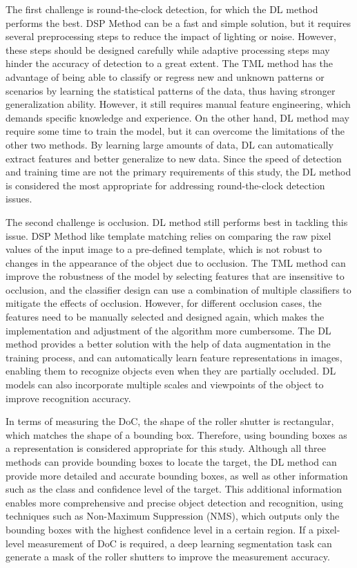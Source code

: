 The first challenge is round-the-clock detection, for which the DL method performs the best. DSP Method can be a fast and simple solution, but it requires several preprocessing steps to reduce the impact of lighting or noise. However, these steps should be designed carefully while adaptive processing steps may hinder the accuracy of detection to a great extent. The TML method has the advantage of being able to classify or regress new and unknown patterns or scenarios by learning the statistical patterns of the data, thus having stronger generalization ability. However, it still requires manual feature engineering, which demands specific knowledge and experience. On the other hand, DL method may require some time to train the model, but it can overcome the limitations of the other two methods. By learning large amounts of data, DL can automatically extract features and better generalize to new data. Since the speed of detection and training time are not the primary requirements of this study, the DL method is considered the most appropriate for addressing round-the-clock detection issues.

The second challenge is occlusion. DL method still performs best in tackling this issue. DSP Method like template matching relies on comparing the raw pixel values of the input image to a pre-defined template, which is not robust to changes in the appearance of the object due to occlusion. The TML method can improve the robustness of the model by selecting features that are insensitive to occlusion, and the classifier design can use a combination of multiple classifiers to mitigate the effects of occlusion. However, for different occlusion cases, the features need to be manually selected and designed again, which makes the implementation and adjustment of the algorithm more cumbersome. The DL method provides a better solution with the help of data augmentation in the training process, and can automatically learn feature representations in images, enabling them to recognize objects even when they are partially occluded. DL models can also incorporate multiple scales and viewpoints of the object to improve recognition accuracy.

In terms of measuring the DoC, the shape of the roller shutter is rectangular, which matches the shape of a bounding box. Therefore, using bounding boxes as a representation is considered appropriate for this study. Although all three methods can provide bounding boxes to locate the target, the DL method can provide more detailed and accurate bounding boxes, as well as other information such as the class and confidence level of the target. This additional information enables more comprehensive and precise object detection and recognition, using techniques such as Non-Maximum Suppression (NMS), which outputs only the bounding boxes with the highest confidence level in a certain region. If a pixel-level measurement of DoC is required, a deep learning segmentation task can generate a mask of the roller shutters to improve the measurement accuracy.


